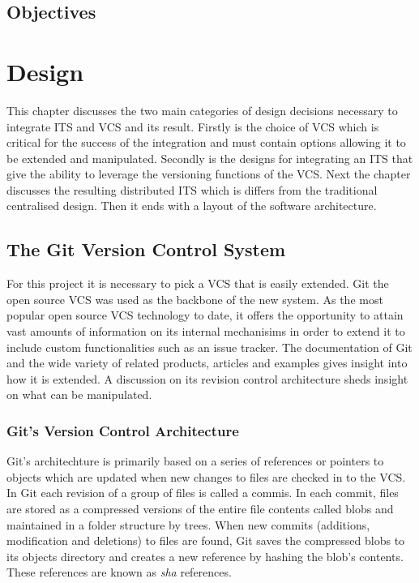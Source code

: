 \documentclass{mproj}
\begin{document}
\section{Objectives}


\chapter{Design}\label{design}

This chapter discusses the two main categories of design decisions necessary to integrate ITS and VCS and its result. Firstly is the choice of VCS which is critical for the success of the integration and must contain options allowing it to be extended and manipulated. Secondly is the designs for integrating an ITS that give the ability to leverage the versioning functions of the VCS. Next the chapter discusses the resulting distributed ITS which is differs from the traditional centralised design. Then it ends with a layout of the software architecture.




\section{The Git Version Control System}

For this project it is necessary to pick a VCS that is easily extended. Git the open source VCS was used as the backbone of the new system. As the most popular open source VCS  technology to date, it offers the opportunity to attain vast amounts of information on its internal mechanisims in order to extend it to include custom functionalities such as an issue tracker. The documentation of Git and the wide variety of related products, articles and examples gives insight into how it is extended. A discussion on its revision control architecture sheds insight on what can be manipulated.



\subsection{Git's Version Control Architecture}

Git's architechture is primarily based on a series of references or pointers to objects which are updated when new changes to files are checked in to the VCS. In Git each revision of a group of files is called a commis. In each commit, files are stored as a compressed versions of the entire file contents called blobs and maintained in a folder structure by trees. When new commits (additions, modification and deletions) to files are found, Git saves the compressed blobs to its objects directory and creates a new reference by hashing the blob's contents. These references are known as \textit{sha} references. 
\end{document}
